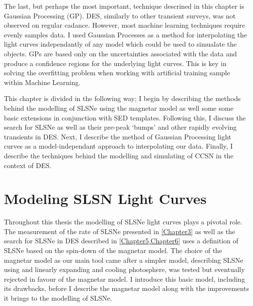 The last, but perhaps the most important, technique descrined in this chapter is Gaussian Processing (GP). DES, similarly to other transient surveys, was not observed on regular cadance. However, most machine learning techniques require evenly samples data. I used Gaussian Processes as a method for interpolating the light curves independantly of any model which could be used to simualate the objects. GPs are based only on the uncertainties associated with the data and produce a confidence regions for the underlying light curves. This is key in solving the overfitting problem when working with artificial training sample within Machine Learning.

This chapter is divided in the following way; I begin by describing the methods behind the modelling of SLSNe using the magnetar model as well some some basic extensions in conjunction with SED templates. Following this, I discuss the search for SLSNe as well as their pre-peak `bumps' and other rapidly evolving transients in DES. Next, I describe the method of Gaussian Processing light curves as a model-independant approach to interpolating our data. Finally, I describe the techniques behind the modelling and simulating of CCSN in the context of DES.

\section{Modeling SLSN Light Curves} \label{sec:SLAP}
Throughout this thesis the modelling of SLSNe light curves plays a pivotal role. The measurement of the rate of SLSNe presented in \cref{Chapter3} as well as the search for SLSNe in DES described in \cref{Chapter5,Chapter6} uses a definition of SLSNe based on the spin-down of the magnetar model. The choice of the magnetar model as our main tool came after a simpler model, describing SLSNe using and linearly expanding and cooling photosphere, was tested but eventually rejected in favour of the magnetar model. I introduce this basic model, including its drawbacks, before I describe the magnetar model along with the improvements it brings to the modelling of SLSNe.


